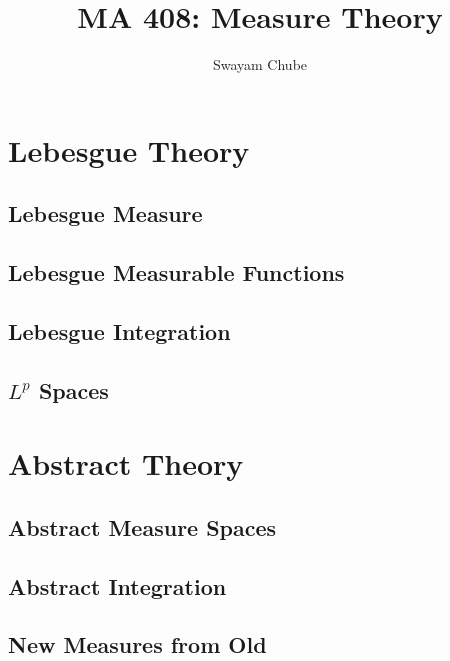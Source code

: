 \documentclass{report}
\title{MA 408: Measure Theory}
\author{Swayam Chube}
\begin{document}
\maketitle
\tableofcontents

\part*{Lebesgue Theory}
\chapter{Lebesgue Measure}


\chapter{Lebesgue Measurable Functions}


\chapter{Lebesgue Integration}


\chapter{\texorpdfstring{$L^p$}{something} Spaces}


\part*{Abstract Theory}

\chapter{Abstract Measure Spaces}


\chapter{Abstract Integration}


\chapter{New Measures from Old}

\end{document}

